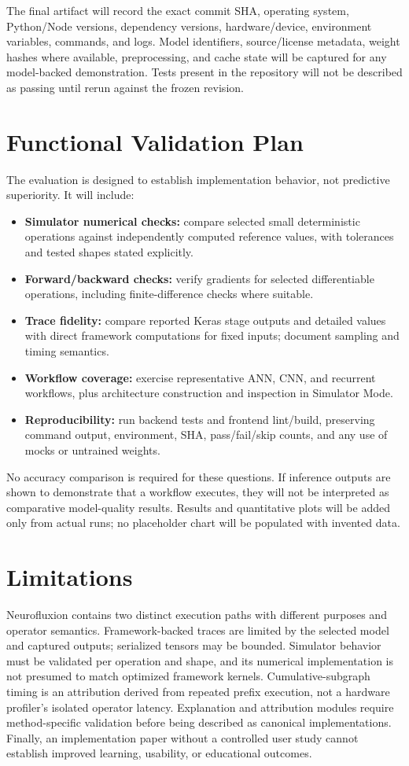 \documentclass[conference]{IEEEtran}
\begin{document}
The final artifact will record the exact commit SHA, operating system, Python/Node versions, dependency versions, hardware/device, environment variables, commands, and logs. Model identifiers, source/license metadata, weight hashes where available, preprocessing, and cache state will be captured for any model-backed demonstration. Tests present in the repository will not be described as passing until rerun against the frozen revision.

\section{Functional Validation Plan}
The evaluation is designed to establish implementation behavior, not predictive superiority. It will include:
\begin{itemize}
 \item \textbf{Simulator numerical checks:} compare selected small deterministic operations against independently computed reference values, with tolerances and tested shapes stated explicitly.
 \item \textbf{Forward/backward checks:} verify gradients for selected differentiable operations, including finite-difference checks where suitable.
 \item \textbf{Trace fidelity:} compare reported Keras stage outputs and detailed values with direct framework computations for fixed inputs; document sampling and timing semantics.
 \item \textbf{Workflow coverage:} exercise representative ANN, CNN, and recurrent workflows, plus architecture construction and inspection in Simulator Mode.
 \item \textbf{Reproducibility:} run backend tests and frontend lint/build, preserving command output, environment, SHA, pass/fail/skip counts, and any use of mocks or untrained weights.
\end{itemize}
No accuracy comparison is required for these questions. If inference outputs are shown to demonstrate that a workflow executes, they will not be interpreted as comparative model-quality results. Results and quantitative plots will be added only from actual runs; no placeholder chart will be populated with invented data.

\section{Limitations}
Neurofluxion contains two distinct execution paths with different purposes and operator semantics. Framework-backed traces are limited by the selected model and captured outputs; serialized tensors may be bounded. Simulator behavior must be validated per operation and shape, and its numerical implementation is not presumed to match optimized framework kernels. Cumulative-subgraph timing is an attribution derived from repeated prefix execution, not a hardware profiler's isolated operator latency. Explanation and attribution modules require method-specific validation before being described as canonical implementations. Finally, an implementation paper without a controlled user study cannot establish improved learning, usability, or educational outcomes.
\end{document}
